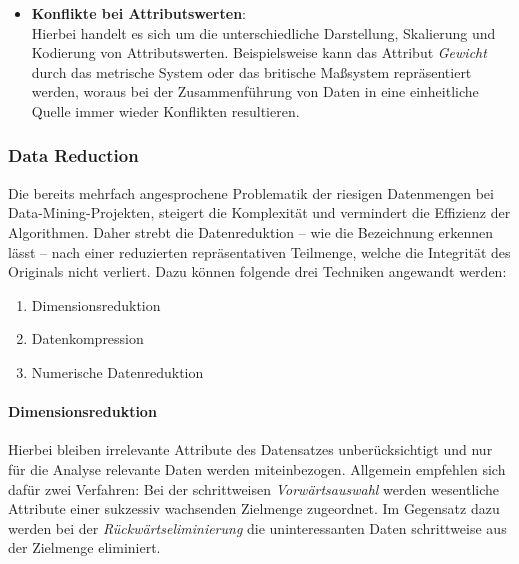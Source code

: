 \begin{itemize}
\item \textbf{Konflikte bei Attributswerten}:
\\ Hierbei handelt es sich um die unterschiedliche Darstellung, Skalierung und Kodierung von Attributswerten. Beispielsweise kann das Attribut \textit{Gewicht} durch das metrische System oder das britische Maßsystem repräsentiert werden, woraus bei der Zusammenführung von Daten in eine einheitliche Quelle immer wieder Konflikten resultieren. 
\end{itemize}

\subsubsection{Data Reduction}
\label{dr}
Die bereits mehrfach angesprochene Problematik der riesigen Datenmengen bei Data-Mining-Projekten, steigert die Komplexität und vermindert die Effizienz der Algorithmen. Daher strebt die Datenreduktion -- wie die Bezeichnung erkennen lässt -- nach einer reduzierten repräsentativen Teilmenge, welche die Integrität des Originals nicht verliert. Dazu können folgende drei Techniken angewandt werden: 

\begin{enumerate}

\item Dimensionsreduktion 

\item Datenkompression

\item Numerische Datenreduktion

\end{enumerate}

\paragraph{Dimensionsreduktion}
Hierbei bleiben irrelevante Attribute des Datensatzes unberücksichtigt und nur für die Analyse relevante Daten werden miteinbezogen. Allgemein empfehlen sich dafür zwei Verfahren: Bei der schrittweisen \textit{Vorwärtsauswahl} werden wesentliche Attribute einer sukzessiv wachsenden Zielmenge zugeordnet. Im Gegensatz dazu werden bei der \textit{Rückwärtseliminierung} die uninteressanten Daten schrittweise aus der Zielmenge eliminiert. 


